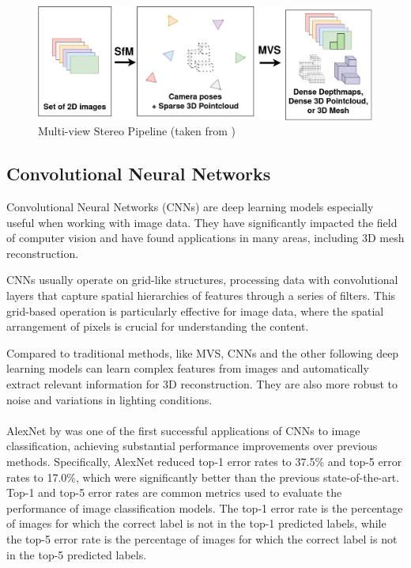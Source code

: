 \begin{figure}
    \centering
    \includegraphics[width=1\linewidth]{images/multi_view_stereo.png}
    \caption{Multi-view Stereo Pipeline (taken from \textcite{rouch_patchmatch_2023})}
    \label{fig:multi_view_stereo}
\end{figure}

\subsection{Convolutional Neural Networks} \label{section:cnns}
Convolutional Neural Networks (CNNs) are deep learning models especially useful when working with image data. They have significantly impacted the field of computer vision and have found applications in many areas, including 3D mesh reconstruction.

CNNs usually operate on grid-like structures, processing data with convolutional layers that capture spatial hierarchies of features through a series of filters. This grid-based operation is particularly effective for image data, where the spatial arrangement of pixels is crucial for understanding the content.

Compared to traditional methods, like MVS, CNNs and the other following deep learning models can learn complex features from images and automatically extract relevant information for 3D reconstruction. They are also more robust to noise and variations in lighting conditions.
\paragraph{}
AlexNet by \textcite{krizhevsky_imagenet_2012} was one of the first successful applications of CNNs to image classification, achieving substantial performance improvements over previous methods. Specifically, AlexNet reduced top-1 error rates to 37.5\% and top-5 error rates to 17.0\%, which were significantly better than the previous state-of-the-art.
Top-1 and top-5 error rates are common metrics used to evaluate the performance of image classification models. The top-1 error rate is the percentage of images for which the correct label is not in the top-1 predicted labels, while the top-5 error rate is the percentage of images for which the correct label is not in the top-5 predicted labels.

